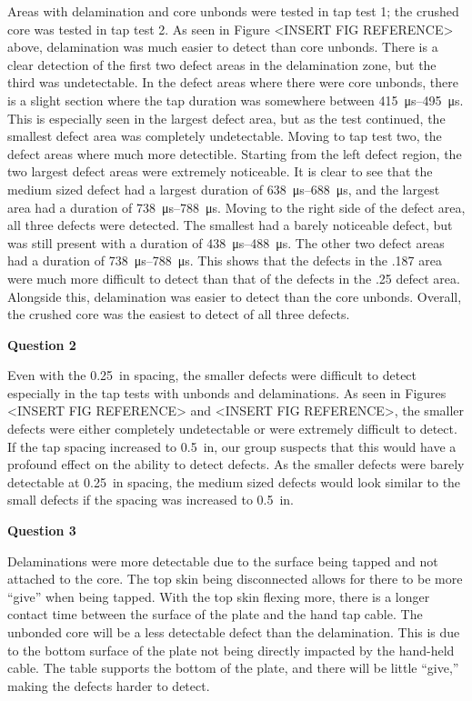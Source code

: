\documentclass[12 pt]{report}
\begin{document}
Areas with delamination and core unbonds were tested in tap test \num{1}; the crushed core was tested in tap test \num{2}. As seen in Figure <INSERT FIG REFERENCE> above, delamination was much easier to detect than core unbonds. There is a clear detection of the first two defect areas in the delamination zone, but the third was undetectable. In the defect areas where there were core unbonds, there is a slight section where the tap duration was somewhere between \qtyrange{415}{495}{\micro\second}. This is especially seen in the largest defect area, but as the test continued, the smallest defect area was completely undetectable. Moving to tap test two, the defect areas where much more detectible. Starting from the left defect region, the two largest defect areas were extremely noticeable. It is clear to see that the medium sized defect had a largest duration of \qtyrange{638}{688}{\micro\second}, and the largest area had a duration of \qtyrange{738}{788}{\micro\second}. Moving to the right side of the defect area, all three defects were detected. The smallest had a barely noticeable defect, but was still present with a duration of \qtyrange{438}{488}{\micro\second}. The other two defect areas had a duration of \qtyrange{738}{788}{\micro\second}. This shows that the defects in the .187 area were much more difficult to detect than that of the defects in the .25 defect area. Alongside this, delamination was easier to detect than the core unbonds. Overall, the crushed core was the easiest to detect of all three defects.

\textbf{Question 2}

Even with the \qty{0.25}{in} spacing, the smaller defects were difficult to detect especially in the tap tests with unbonds and delaminations. As seen in Figures <INSERT FIG REFERENCE> and <INSERT FIG REFERENCE>, the smaller defects were either completely undetectable or were extremely difficult to detect. If the tap spacing increased to \qty{0.5}{in}, our group suspects that this would have a profound effect on the ability to detect defects. As the smaller defects were barely detectable at \qty{0.25}{in} spacing, the medium sized defects would look similar to the small defects if the spacing was increased to \qty{0.5}{in}. 

\textbf{Question 3}

Delaminations were more detectable due to the surface being tapped and not attached to the core. The top skin being disconnected allows for there to be more ``give'' when being tapped. With the top skin flexing more, there is a longer contact time between the surface of the plate and the hand tap cable. The unbonded core will be a less detectable defect than the delamination. This is due to the bottom surface of the plate not being directly impacted by the hand-held cable. The table supports the bottom of the plate, and there will be little ``give,'' making the defects harder to detect.
\end{document}
